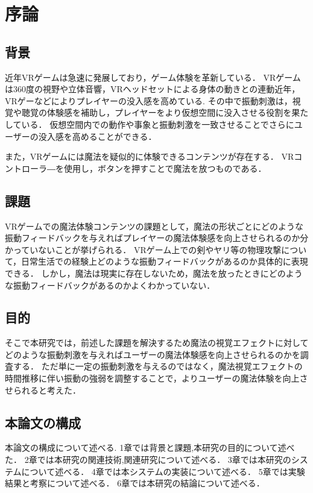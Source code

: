 \chapter{序論}
\section{背景}
近年VRゲームは急速に発展しており，ゲーム体験を革新している．
VRゲームは360度の視野や立体音響，VRヘッドセットによる身体の動きとの連動近年，VRゲーなどによりプレイヤーの没入感を高めている.
その中で振動刺激は，視覚や聴覚の体験感を補助し，プレイヤーをより仮想空間に没入させる役割を果たしている．
仮想空間内での動作や事象と振動刺激を一致させることでさらにユーザーの没入感を高めることができる．

また，VRゲームには魔法を疑似的に体験できるコンテンツが存在する．
VRコントローラ―を使用し，ボタンを押すことで魔法を放つものである．


\section{課題}
VRゲームでの魔法体験コンテンツの課題として，魔法の形状ごとにどのような振動フィードバックを与えればプレイヤーの魔法体験感を向上させられるのか分かっていないことが挙げられる．
VRゲーム上での剣やヤリ等の物理攻撃について，日常生活での経験上どのような振動フィードバックがあるのか具体的に表現できる．
しかし，魔法は現実に存在しないため，魔法を放ったときにどのような振動フィードバックがあるのかよくわかっていない．


\section{目的}
そこで本研究では，前述した課題を解決するため魔法の視覚エフェクトに対してどのような振動刺激を与えればユーザーの魔法体験感を向上させられるのかを調査する．
ただ単に一定の振動刺激を与えるのではなく，魔法視覚エフェクトの時間推移に伴い振動の強弱を調整することで，よりユーザーの魔法体験を向上させられると考えた．

\section{本論文の構成}
本論文の構成について述べる.
1章では背景と課題,本研究の目的について述べた．
2章では本研究の関連技術,関連研究について述べる．
3章では本研究のシステムについて述べる．
4章では本システムの実装について述べる．
5章では実験結果と考察について述べる．
6章では本研究の結論について述べる．
